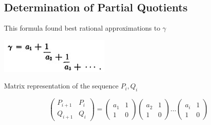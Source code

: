 \documentclass{article}
\begin{document}
\begin{multicols}{3}
		
		
		
		 \vspace{-0.5cm}
		\section*{Determination of Partial Quotients}
            \vspace{-0.5cm}
            \begin{minipage}[t]{.96\linewidth}
                \Large This formula found best rational approximations to $\gamma$
            \end{minipage}
            
		\begin{minipage}[t]{.96\linewidth}
			    \centering
			    \includegraphics[scale=0.9]{p.jpg}
			    \label{fig:my_label}
		\end{minipage}

            \begin{minipage}[t]{.96\linewidth}
                \vspace{-0.5cm}\Large \hspace{-0.5cm}Matrix representation of the sequence $P_i, Q_i$
            \end{minipage}
             \begin{equation*}
             \left(
            \begin{array}{cc}
                    P_{i+1} & P_i  \\
                    Q_{i+1} & Q_i 
            \end{array}
            \right)=
            \left(
            \begin{array}{cc}
                    a_1 & 1  \\
                    1 & 0 
            \end{array}
            \right)
            \left(
            \begin{array}{cc}
                    a_2 & 1  \\
                    1 & 0 
            \end{array}
            \right)...
            \left(
            \begin{array}{cc}
                    a_i & 1  \\
                    1 & 0 
            \end{array}
            \right)
            \end{equation*}  


\end{multicols}
\end{document}
